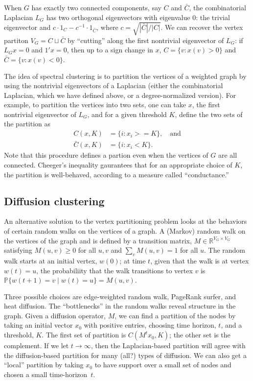 \documentclass{article}
\newcommand{\reals}{\mathbb{R}}
\newcommand{\prob}{\mathbb{P}}
\begin{document}
When $G$ has exactly two connected components, say $C$ and $\bar C$,
the combinatorial Laplacian $L_G$ has two orthogonal eigenvectors
with eigenvalue $0$: the trivial eigenvector and
$c \cdot 1_C - c^{-1} \cdot 1_{\bar C}$, where
$c = \sqrt{|\bar C| / |C|}$.  We can recover the vertex partiton
$V_G = C \sqcup \bar C$ by ``cutting'' along the first nontrivial
eigenvector of $L_G$: if $L_G x = 0$ and $1' x = 0$, then up to a sign
change in $x$, $C = \{ v : x(v) > 0 \}$ and
$\bar C = \{ v : x(v) < 0 \}$.

The idea of spectral clustering is to partition the vertices of a
weighted graph by using the nontrivial eigenvectors of a Laplacian
(either the combinatorial Laplacian, which we have defined above, or a
degree-normalized version).  For example, to partition the vertices
into two sets, one can take $x$, the first nontrivial eigenvector of
$L_G$, and for a given threshold $K$, define the two sets of the partition as
\begin{align*}
  C(x,K)      &= \{ i : x_i >= K \}, \quad \text{and} \\
  \bar C(x,K) &= \{ i : x_i < K \}.
\end{align*}
Note that this procedure defines a partion even when the vertices of
$G$ are all connected.  Cheeger's inequality gaurantees that for an
appropriate choice of $K$, the partition is well-behaved, according to a
measure called ``conductance.''


\subsection{Diffusion clustering}

An alternative solution to the vertex partitioning problem looks at the
behaviors of certain random walks on the vertices of a graph. A (Markov)
random walk on the vertices of the graph and is defined by a
transition matrix, $M \in \reals^{V_G \times V_G}$ satisfying
$M(u,v) \geq 0$ for all $u,v$ and $\sum_v M(u,v) = 1$ for all
$u$.  The random walk starts at an initial vertex, $w(0)$; at time
$t$, given that the walk is at vertex $w(t) = u$, the probabiliity that
the walk transitions to vertex $v$ is
$\prob\{w(t+1) = v \mid w(t) = u\} = M(u, v)$.

Three possible choices are edge-weighted random walk, PageRank surfer, and heat diffusion.  The ``bottlenecks'' in the random walks reveal structure in the graph.  Given a diffusion operator, $M$, we can find a partition of the nodes by taking an initial vector $x_0$ with positive entries, choosing time horizon, $t$, and a threshold, $K$.  The first set of partition is $C(M^t x_0, K)$; the other set is the complement.  If we let $t\to \infty$, then the Laplacian-based partition will agree with the diffusion-based partition for many (all?) types of diffusion.  We can also get a ``local'' partition by taking $x_0$ to have support over a small set of nodes and chosen a small time-horizon~$t$.
\end{document}
